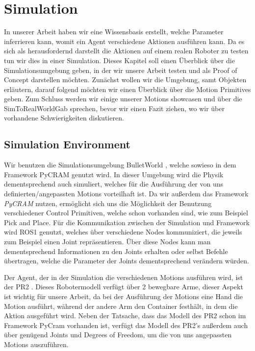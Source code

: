 \chapter{Simulation}
In unserer Arbeit haben wir eine Wissensbasis erstellt, welche Parameter inferrieren kann, womit ein Agent verschiedene Aktionen ausführen kann. Da es sich als herausfordernd darstellt die Aktionen auf einem realen Roboter zu testen tun wir dies in einer Simulation.
Dieses Kapitel soll einen Überblick über die Simulationsumgebung geben, in der wir unsere Arbeit testen und als Proof of Concept darstellen möchten.
Zunächst wollen wir die Umgebung, samt Objekten erläutern, darauf folgend möchten wir einen Überblick über die Motion Primitives geben.
Zum Schluss werden wir einige unserer Motions showcasen und über die SimToRealWorldGab sprechen, bevor wir einen Fazit ziehen, wo wir über vorhandene Schwierigkeiten diskutieren.

\section{Simulation Environment}
Wir benutzen die Simulationsumgebung BulletWorld , welche sowieso in dem Framework PyCRAM  genutzt wird. 
In dieser Umgebung wird die Physik dementsprechend auch simuliert, welches für die Ausführung der von uns definierten/angepassten Motions vorteilhaft ist.
Da wir außerdem das Framework \textit{PyCRAM} nutzen, ermöglicht sich uns die Möglichkeit der Benutzung verschiedener Control Primitiven, welche schon vorhanden sind, wie zum Beispiel Pick and Place.
Für die Kommunikation zwischen der Simulation und Framework wird ROS1  genutzt, welches über verschiedene Nodes kommuniziert, die jeweils zum Beispiel einen Joint repräsentieren.
Über diese Nodes kann man dementsprechend Informationen zu den Joints erhalten oder selbst Befehle übertragen, welche die Parameter der Joints dementsprechend verändern würden.

Der Agent, der in der Simulation die verschiedenen Motions ausführen wird, ist der PR2 . Dieses Robotermodell verfügt über 2 bewegbare Arme, dieser Aspekt ist wichtig für unsere Arbeit, da bei der Ausführung der Motions eine Hand die Motion ausführt, während der andere Arm den Container festhält, in dem die Aktion ausgeführt wird.
Neben der Tatsache, dass das Modell des PR2 schon im Framework PyCram vorhanden ist, verfügt das Modell des PR2's außerdem auch über genügend Joints und Degrees of Freedom, um die von uns angepassten Motions auszuführen.

